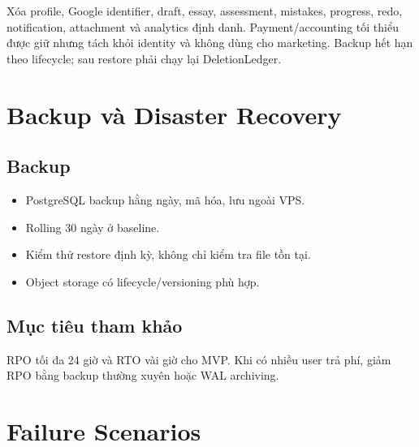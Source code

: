 \documentclass[11pt,a4paper]{article}
\begin{document}
Xóa profile, Google identifier, draft, essay, assessment, mistakes, progress, redo, notification, attachment và analytics định danh. Payment/accounting tối thiểu được giữ nhưng tách khỏi identity và không dùng cho marketing. Backup hết hạn theo lifecycle; sau restore phải chạy lại DeletionLedger.

\section{Backup và Disaster Recovery}

\subsection{Backup}
\begin{itemize}
  \item PostgreSQL backup hằng ngày, mã hóa, lưu ngoài VPS.
  \item Rolling 30 ngày ở baseline.
  \item Kiểm thử restore định kỳ, không chỉ kiểm tra file tồn tại.
  \item Object storage có lifecycle/versioning phù hợp.
\end{itemize}

\subsection{Mục tiêu tham khảo}
RPO tối đa 24 giờ và RTO vài giờ cho MVP. Khi có nhiều user trả phí, giảm RPO bằng backup thường xuyên hoặc WAL archiving.

\section{Failure Scenarios}
\end{document}
